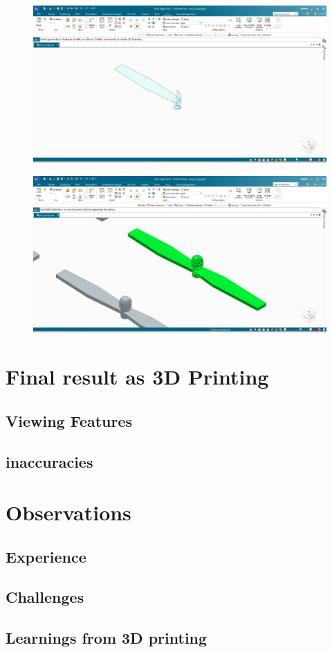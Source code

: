 \documentclass{article}
\begin{document}
\begin{figure}[H]
\centering
\includegraphics[scale = 0.3 ]{./figs/12.jpeg}
\end{figure}
\begin{figure}[H]
\centering
\includegraphics[scale = 0.3 ]{./figs/13.jpeg}
\end{figure}
\section{Final result as 3D Printing}
\subsection{Viewing Features}
\subsection{inaccuracies}


\section{Observations}
\subsection{Experience}
\subsection{Challenges}
\subsection{Learnings from 3D printing}
\end{document}
